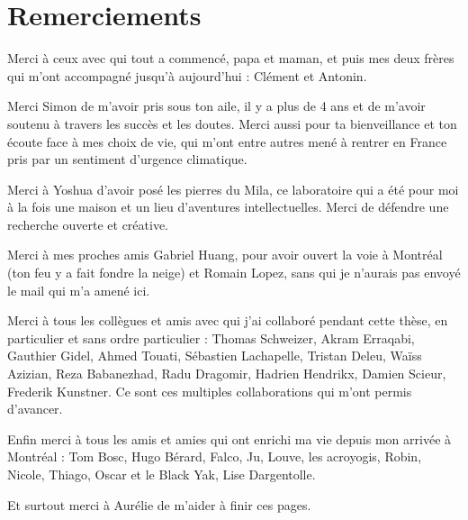 \documentclass[12pt]{report} %
\numberwithin{equation}{chapter}
\numberwithin{table}{chapter}
\numberwithin{figure}{chapter}
\begin{document}

\chapter*{Remerciements}

Merci  à ceux avec qui tout a commencé, papa et maman, et puis mes deux frères qui m'ont accompagné jusqu'à aujourd'hui : Clément et Antonin.

Merci Simon de m'avoir pris sous ton aile, il y a plus de 4 ans et de m'avoir soutenu à travers les succès et les doutes. Merci aussi pour ta bienveillance et ton écoute face à mes choix de vie, qui m'ont entre autres mené à rentrer en France pris par un sentiment d'urgence climatique.

Merci à Yoshua d'avoir posé les pierres du Mila, ce laboratoire qui a été pour moi à la fois une maison et un lieu d'aventures intellectuelles. Merci de défendre une recherche ouverte et créative.

Merci à mes proches amis Gabriel Huang, pour avoir ouvert la voie à Montréal (ton feu y a fait fondre la neige) et Romain Lopez, sans qui je n'aurais pas envoyé le mail qui m'a amené ici.

Merci à tous les collègues et amis avec qui j'ai collaboré pendant cette thèse, en particulier et sans ordre particulier : 
Thomas Schweizer, Akram Erraqabi, Gauthier Gidel, Ahmed Touati, Sébastien Lachapelle, Tristan Deleu, Waïss Azizian, Reza Babanezhad, Radu Dragomir, Hadrien Hendrikx,  Damien Scieur, Frederik Kunstner.
Ce sont ces multiples collaborations qui m'ont permis d'avancer.

Enfin merci à tous les amis et amies qui ont enrichi ma vie depuis mon arrivée à Montréal : 
Tom Bosc, Hugo Bérard, Falco, Ju, Louve, les acroyogis, Robin, Nicole, Thiago, Oscar et le Black Yak, Lise Dargentolle.

Et surtout merci à Aurélie de m'aider à finir ces pages.

\cleardoublepage

%
\end{document}
